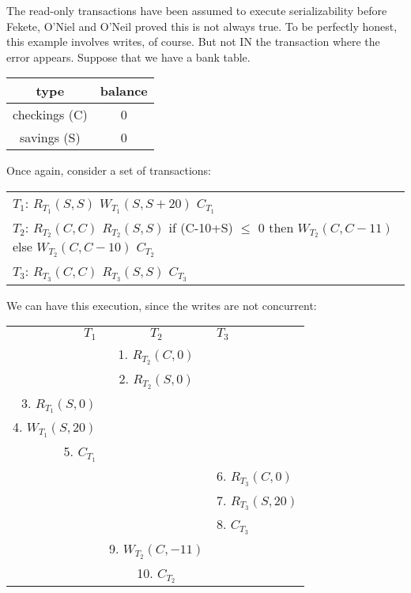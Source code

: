 The read-only transactions have been assumed to execute serializability before Fekete, O'Niel and O'Neil proved this is not always true\cite{DBLP:journals/sigmod/FeketeOO04}.
To be perfectly honest, this example involves writes, of course. But not IN the transaction where the error appears. Suppose that we have a bank table.

\begin{table}[H]
  \centering
  \begin{tabular}{ c | c }
    type & balance \\
    \hline
    checkings (C) & 0 \\
    savings (S) & 0 \\
  \end{tabular}
\end{table}

Once again, consider a set of transactions:
\begin{table}[H]
  \centering
  \begin{tabular}{ l }
    $T{_1}$:   $R_{T_1}(S, S)$ $W_{T_1}(S, S+20)$ $C_{T_1}$ \\
    $T{_2}$:   $R_{T_2}(C, C)$ $R_{T_2}(S, S)$ if (C-10+S) $\leq$ 0 then $W_{T_2}(C, C-11)$ else $W_{T_2}(C, C-10)$ $C_{T_2}$ \\
    $T{_3}$:   $R_{T_3}(C, C)$ $R_{T_3}(S, S)$ $C_{T_3}$ \\
  \end{tabular}
\end{table}

We can have this execution, since the writes are not concurrent:

\begin{table}[H]
  \centering
  \begin{tabular}{ r | c | l }
    $T_1$ & $T_2$ & $T_3$ \\
    & 1. $R_{T_2}(C,0)$ & \\
    & 2. $R_{T_2}(S,0)$ & \\
    3. $R_{T_1}(S,0)$ & & \\
    4. $W_{T_1}(S,20)$ & & \\
    5. $C_{T_1}$ & & \\
    & & 6. $R_{T_3}(C,0)$ \\
    & & 7. $R_{T_3}(S,20)$ \\
    & & 8. $C_{T_3}$ \\
    & 9. $W_{T_2}(C,-11)$ & \\
    & 10. $C_{T_2}$ & \\
  \end{tabular}
\end{table}

